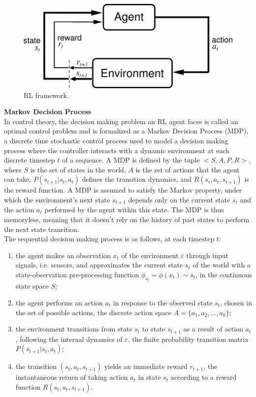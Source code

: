 \begin{figure}[h]
\includegraphics[scale=0.5]{img/I/figtmp7.png}
\centering
\captionsetup{justification=centering}
\caption{RL framework.}
\end{figure}

\textbf{Markov Decision Process} \\
In control theory, the decision making problem an RL agent faces is called an optimal control problem and is formalized as a Markov Decision Process (MDP), a discrete time stochastic control process used to model a decision making process where the controller interacts with a dynamic environment at each discrete timestep $t$ of a sequence. A MDP is defined by the tuple $<S,A,P,R>$, where $S$ is the set of states in the world, $A$ is the set of actions that the agent can take, $P(s_{t+1}|s_t,a_t)$ defines the transition dynamics, and $R(s_t,a_t,s_{t+1})$ is the reward function. A MDP is assumed to satisfy the Markov property, under which the environment's next state $s_{t+1}$ depends only on the current state $s_t$ and the action $a_t$ performed by the agent within this state. The MDP is thus memoryless, meaning that it doesn't rely on the history of past states to perform the next state transition. \\
The sequential decision making process is as follows, at each timestep $t$: 
\begin{enumerate}
    \setlength\itemsep{-0.5em}
    \item the agent makes an observation $x_t$ of  the environment $\varepsilon$ through input signals, i.e. sensors, and approximates the current state $s_t$ of the world with a state-observation pre-processing function $\phi_{s_t} = \phi(x_t) \sim s_t$, in the continuous state space $S$;
    \item the agent performs an action $a_t$ in response to the observed state $s_t$, chosen in the set of possible actions, the discrete action space $A=\{a_1,a_2,...,a_k\}$;
    \item the environment transitions from state $s_t$ to state $s_{t+1}$ as a result of action $a_t$, following the internal dynamics of $\varepsilon$, the finite probability transition matrix $P(s_{t+1}|s_t,a_t)$;
    \item the transition $(s_t,a_t,s_{t+1})$ yields an immediate reward $r_{t+1}$, the instantaneous return of taking action $a_t$ in state $s_t$ according to a reward function $R(s_t,a_t,s_{t+1})$.
\end{enumerate}
